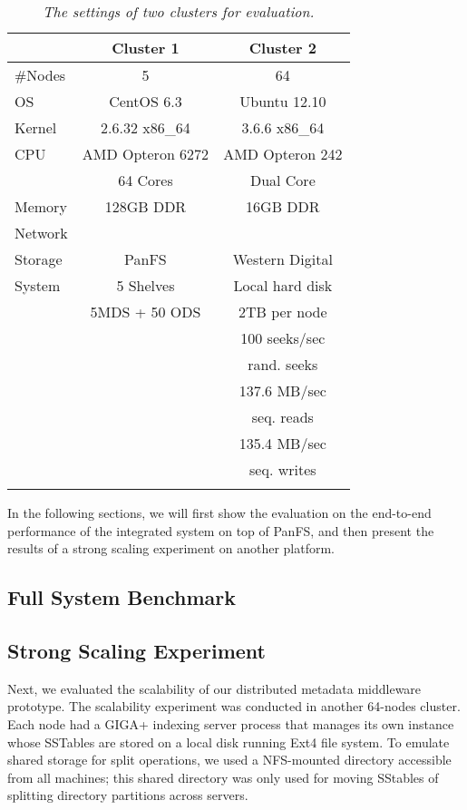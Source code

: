 \begin{table}
\begin{tabular}{lcc}
\toprule
      & Cluster 1 & Cluster 2 \\
\midrule
\#Nodes & 5 & 64 \\
\hline
OS &   CentOS 6.3 &  Ubuntu 12.10 \\
Kernel & 2.6.32 x86\_64 & 3.6.6 x86\_64 \\
\hline
CPU & AMD Opteron 6272 &  AMD Opteron 242 \\
    & 64 Cores & Dual Core\\
\hline
Memory & 128GB DDR &  16GB DDR \\
\hline
Network &       &           \\
\hline
Storage & PanFS & Western Digital \\
System &      5 Shelves & Local hard disk  \\
       &   5MDS + 50 ODS &  2TB per node  \\
& & 100 seeks/sec \\
& & rand. seeks   \\
& & 137.6 MB/sec  \\
& & seq. reads    \\
& & 135.4 MB/sec  \\
& & seq. writes   \\
\bottomrule \\
\end{tabular}
\caption{
\textit{The settings of two clusters for evaluation.}
}
\label{tab:setting}
\end{table}

In the following sections, we will first show the evaluation
on the end-to-end performance of the integrated system on top of PanFS,
and then present the results of a strong scaling experiment on another platform. 

\subsection{Full System Benchmark}
\label{sec:fullsystem}


\subsection{Strong Scaling Experiment}
Next, we evaluated the scalability of our distributed metadata middleware prototype.
The scalability experiment was conducted in another 64-nodes cluster.
Each node had a GIGA+ indexing server process that manages its own \tfs
instance whose SSTables are stored on a local disk running Ext4 file system.
To emulate shared storage for split operations,
we used a NFS-mounted directory accessible from all machines;
this shared directory was only used for moving SStables of
splitting directory partitions across servers.

